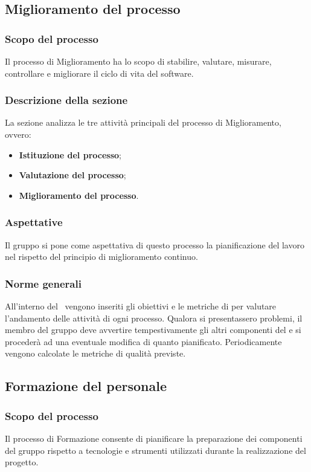 \subsection{Miglioramento del processo}
\subsubsection{Scopo del processo}
Il processo di Miglioramento ha lo scopo di stabilire, valutare, misurare, controllare e migliorare il ciclo di vita del software.
\subsubsection{Descrizione della sezione}
La sezione analizza le tre attività principali del processo di Miglioramento, ovvero:
\begin{itemize}
	\item \textbf{Istituzione del processo};	
	\item \textbf{Valutazione del processo};
	\item \textbf{Miglioramento del processo}.
\end{itemize}
\subsubsection{Aspettative}
Il gruppo si pone come aspettativa di questo processo la pianificazione del lavoro nel rispetto del principio di miglioramento continuo.
\subsubsection{Norme generali}\label{PO_NormeGenerali}
All'interno del \PdQv{}\ vengono inseriti gli obiettivi e le metriche di  per valutare l'andamento delle attività di ogni processo. Qualora si presentassero problemi, il membro del gruppo deve avvertire tempestivamente gli altri componenti del  e si procederà ad una eventuale modifica di quanto pianificato. Periodicamente vengono calcolate le metriche di qualità previste.

\subsection{Formazione del personale}
\subsubsection{Scopo del processo}
Il processo di Formazione consente di pianificare la preparazione dei componenti del gruppo rispetto a tecnologie e strumenti utilizzati durante la realizzazione del progetto.
